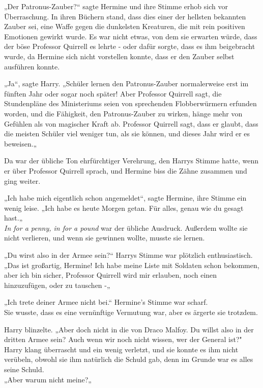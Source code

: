 {„Der Patronus-Zauber?“ sagte Hermine und ihre Stimme erhob sich vor Überraschung. In ihren Büchern stand, dass dies einer der hellsten bekannten Zauber sei, eine Waffe gegen die dunkelsten Kreaturen, die mit rein positiven Emotionen gewirkt wurde. Es war nicht etwas, von dem sie erwarten würde, dass der böse Professor Quirrell es lehrte - oder dafür sorgte, dass es ihm beigebracht wurde, da Hermine sich nicht vorstellen konnte, dass er den Zauber selbst ausführen konnte.

„Ja“, sagte Harry. „Schüler lernen den Patronus-Zauber normalerweise erst im fünften Jahr oder sogar noch später! Aber Professor Quirrell sagt, die Stundenpläne des Ministeriums seien von sprechenden Flobberwürmern erfunden worden, und die Fähigkeit, den Patronus-Zauber zu wirken, hänge mehr von Gefühlen als von magischer Kraft ab. Professor Quirrell sagt, dass er glaubt, dass die meisten Schüler viel weniger tun, als sie können, und dieses Jahr wird er es beweisen.„

Da war der übliche Ton ehrfürchtiger Verehrung, den Harrys Stimme hatte, wenn er über Professor Quirrell sprach, und Hermine biss die Zähne zusammen und ging weiter.

„Ich habe mich eigentlich schon angemeldet“, sagte Hermine, ihre Stimme ein wenig leise. „Ich habe es heute Morgen getan. Für alles, genau wie du gesagt hast.„\\ \emph{In for a penny, in for a pound} war der übliche Ausdruck. Außerdem wollte sie nicht verlieren, und wenn sie gewinnen wollte, musste sie lernen.

„Du wirst also in der Armee sein?“ Harrys Stimme war plötzlich enthusiastisch.\\ „Das ist großartig, Hermine! Ich habe meine Liste mit Soldaten schon bekommen, aber ich bin sicher, Professor Quirrell wird mir erlauben, noch einen hinzuzufügen, oder zu tauschen -„

„Ich trete deiner Armee nicht bei.“ Hermine's Stimme war scharf.\\ Sie wusste, dass es eine vernünftige Vermutung war, aber es ärgerte sie trotzdem.

Harry blinzelte. „Aber doch nicht in die von Draco Malfoy. Du willst also in der dritten Armee sein? Auch wenn wir noch nicht wissen, wer der General ist?"\\ Harry klang überrascht und ein wenig verletzt, und sie konnte es ihm nicht verübeln, obwohl sie ihm natürlich die Schuld gab, denn im Grunde war es alles seine Schuld.\\ „Aber warum nicht meine?„

}
